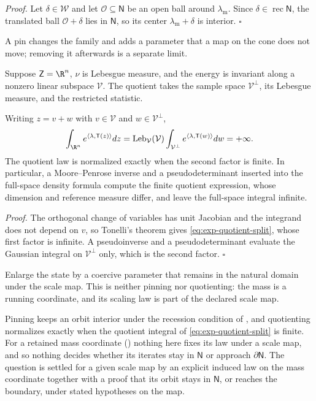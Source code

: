 \noindent\emph{Proof.}
Let \(\delta\in\mathcal W\) and let \(\mathcal O\subseteq\mathsf N\) be an open ball
around \(\lambda_{\mathrm m}\). Since \(\delta\in\operatorname{rec}\mathsf N\),
the translated ball \(\mathcal O+\delta\) lies in \(\mathsf N\), so its center
\(\lambda_{\mathrm m}+\delta\) is interior. \(\square\)

A pin changes the family and adds a parameter that a map on the cone does not
move; removing it afterwards is a separate limit.

Suppose \(\mathsf Z=\R^n\), \(\nu\) is Lebesgue measure, and the energy is
invariant along a nonzero linear subspace \(\mathcal V\). The quotient takes
the sample space \(\mathcal V^\perp\), its Lebesgue measure, and the restricted
statistic.

Writing \(z=v+w\) with \(v\in\mathcal V\) and \(w\in\mathcal V^\perp\),
\begin{equation}
\int_{\R^n}e^{\langle\lambda,\mathsf T(z)\rangle}dz
=\operatorname{Leb}_{\mathcal V}(\mathcal V)
\int_{\mathcal V^\perp}e^{\langle\lambda,\mathsf T(w)\rangle}dw
=+\infty.
\label{eq:exp-quotient-split}
\end{equation}
The quotient law is normalized exactly when the second factor is finite. In
particular, a Moore--Penrose inverse and a pseudodeterminant inserted into the
full-space density formula compute the finite quotient expression, whose
dimension and reference measure differ, and leave the full-space integral
infinite. 

\noindent\emph{Proof.}
The orthogonal change of variables has unit Jacobian and the integrand does
not depend on \(v\), so Tonelli's theorem gives
\eqref{eq:exp-quotient-split}, whose first factor is infinite. A
pseudoinverse and a pseudodeterminant evaluate the Gaussian integral on
\(\mathcal V^\perp\) only, which is the second factor. \(\square\)

Enlarge the state by a coercive parameter that remains in the natural domain
under the scale map. This is neither pinning nor quotienting: the mass is a
running coordinate, and its scaling law is part of the declared scale map.

Pinning keeps an orbit interior under the recession condition of
, and quotienting normalizes exactly when
the quotient integral of \eqref{eq:exp-quotient-split} is finite. For a
retained mass coordinate () nothing here fixes its
law under a scale map, and so nothing decides whether its iterates stay in
\(\mathsf N\) or approach \(\partial\mathsf N\). The question is settled for a
given scale map by an explicit induced law on the mass coordinate together
with a proof that its orbit stays in \(\mathsf N\), or reaches the boundary,
under stated hypotheses on the map.

